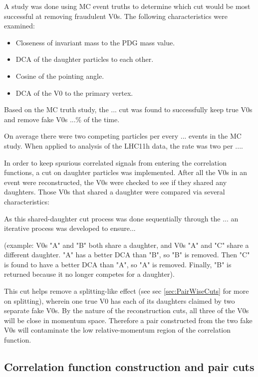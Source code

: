 A study was done using MC event truths to determine which cut would be most successful at removing fraudulent V0s.  The following characteristics were examined:

\begin{itemize}
\item Closeness of invariant mass to the PDG mass value.
\item DCA of the daughter particles to each other.
\item Cosine of the pointing angle.
\item DCA of the V0 to the primary vertex.
\end{itemize}

Based on the MC truth study, the ... cut was found to successfully keep true V0s and remove fake V0s ...\% of the time.  

On average there were two competing particles per every ... events in the MC study.  When applied to analysis of the LHC11h data, the rate was two per ....

In order to keep spurious correlated signals from entering the correlation functions, a cut on daughter particles was implemented.  After all the V0s in an event were reconstructed, the V0s were checked to see if they shared any daughters.  Those V0s that shared a daughter were compared via several characteristics:

As this shared-daughter cut process was done sequentially through the ... an iterative process was developed to ensure... 

(example: V0s "A" and "B" both share a daughter, and V0s "A" and "C" share a different daughter.  "A" has a better DCA than "B", so "B" is removed.  Then "C" is found to have a better DCA than "A", so "A" is removed.  Finally, "B" is returned because it no longer competes for a daughter).

This cut helps remove a splitting-like effect (see sec \ref{sec:PairWiseCuts} for more on splitting), wherein one true V0 has each of its daughters claimed by two separate fake V0s.  By the nature of the reconstruction cuts, all three of the V0s will be close in momentum space.  Therefore a pair constructed from the two fake V0s will contaminate the low relative-momentum region of the correlation function.  


\subsection{Correlation function construction and pair cuts}
\label{sec:CFconstruct}

